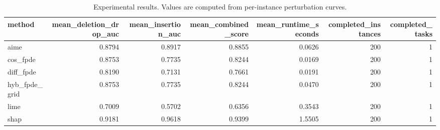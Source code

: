 \begin{table}[t]
\caption{Experimental results. Values are computed from per-instance perturbation curves.}
\label{tab:main_results_computed}
\centering
\begin{tabular}{lrrrrrr}
\toprule
method & mean\_deletion\_drop\_auc & mean\_insertion\_auc & mean\_combined\_score & mean\_runtime\_seconds & completed\_instances & completed\_tasks \\
\midrule
aime & 0.8794 & 0.8917 & 0.8855 & 0.0626 & 200 & 1 \\
cos\_fpde & 0.8753 & 0.7735 & 0.8244 & 0.0169 & 200 & 1 \\
diff\_fpde & 0.8190 & 0.7131 & 0.7661 & 0.0191 & 200 & 1 \\
hyb\_fpde\_grid & 0.8753 & 0.7735 & 0.8244 & 0.0470 & 200 & 1 \\
lime & 0.7009 & 0.5702 & 0.6356 & 0.3543 & 200 & 1 \\
shap & 0.9181 & 0.9618 & 0.9399 & 1.5505 & 200 & 1 \\
\bottomrule
\end{tabular}

\end{table}
